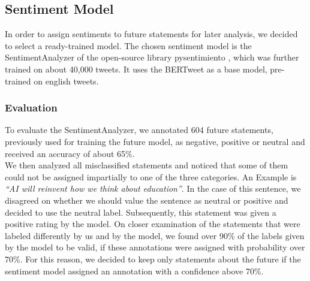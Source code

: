 \subsection{Sentiment Model}
In order to assign sentiments to future statements for later analysis, we decided to select a ready-trained model.
The chosen sentiment model is the SentimentAnalyzer of the open-source library pysentimiento \citep{perez2021pysentimiento}, which was further trained on about 40,000 tweets.
It uses the BERTweet \citep{bertweet} as a base model, pre-trained on english tweets.

\subsubsection{Evaluation}
To evaluate the SentimentAnalyzer, we annotated 604 future statements, previously used for training the future model, as negative, positive or neutral and received an accuracy of about 65\%.
\\
We then analyzed all misclassified statements and noticed that some of them could not be assigned impartially to one of the three categories.
An Example is \emph{``AI will reinvent how we think about education''}.
In the case of this sentence, we disagreed on whether we should value the sentence as neutral or positive and decided to use the neutral label.
Subsequently, this statement was given a positive rating by the model.
On closer examination of the statements that were labeled differently by us and by the model, we found over 90\% of the labels given by the model to be valid, if these annotations were assigned with probability over 70\%.
For this reason, we decided to keep only statements about the future if the sentiment model assigned an annotation with a confidence above 70\%.

